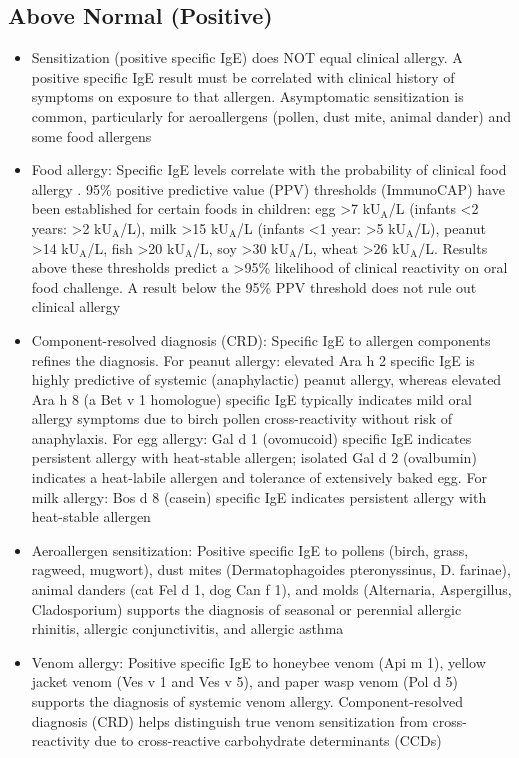 \subsection*{Above Normal (Positive)}
\begin{itemize}
  \item Sensitization (positive specific IgE) does NOT equal clinical allergy. A positive specific IgE result must be correlated with clinical history of symptoms on exposure to that allergen. Asymptomatic sensitization is common, particularly for aeroallergens (pollen, dust mite, animal dander) and some food allergens
  \item Food allergy: Specific IgE levels correlate with the probability of clinical food allergy \cite{sampson2014food}. 95\% positive predictive value (PPV) thresholds (ImmunoCAP) have been established for certain foods in children: egg >7 kU$_\text{A}$/L (infants <2 years: >2 kU$_\text{A}$/L), milk >15 kU$_\text{A}$/L (infants <1 year: >5 kU$_\text{A}$/L), peanut >14 kU$_\text{A}$/L, fish >20 kU$_\text{A}$/L, soy >30 kU$_\text{A}$/L, wheat >26 kU$_\text{A}$/L. Results above these thresholds predict a >95\% likelihood of clinical reactivity on oral food challenge. A result below the 95\% PPV threshold does not rule out clinical allergy
  \item Component-resolved diagnosis (CRD): Specific IgE to allergen components refines the diagnosis. For peanut allergy: elevated Ara h 2 specific IgE is highly predictive of systemic (anaphylactic) peanut allergy, whereas elevated Ara h 8 (a Bet v 1 homologue) specific IgE typically indicates mild oral allergy symptoms due to birch pollen cross-reactivity without risk of anaphylaxis. For egg allergy: Gal d 1 (ovomucoid) specific IgE indicates persistent allergy with heat-stable allergen; isolated Gal d 2 (ovalbumin) indicates a heat-labile allergen and tolerance of extensively baked egg. For milk allergy: Bos d 8 (casein) specific IgE indicates persistent allergy with heat-stable allergen
  \item Aeroallergen sensitization: Positive specific IgE to pollens (birch, grass, ragweed, mugwort), dust mites (Dermatophagoides pteronyssinus, D. farinae), animal danders (cat Fel d 1, dog Can f 1), and molds (Alternaria, Aspergillus, Cladosporium) supports the diagnosis of seasonal or perennial allergic rhinitis, allergic conjunctivitis, and allergic asthma
  \item Venom allergy: Positive specific IgE to honeybee venom (Api m 1), yellow jacket venom (Ves v 1 and Ves v 5), and paper wasp venom (Pol d 5) supports the diagnosis of systemic venom allergy. Component-resolved diagnosis (CRD) helps distinguish true venom sensitization from cross-reactivity due to cross-reactive carbohydrate determinants (CCDs)

\end{itemize}
